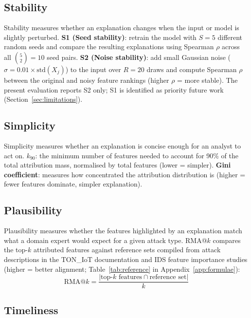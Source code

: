 \documentclass[12pt,a4paper]{report}
\begin{document}
\subsection{Stability}
\label{sec:stability}

Stability measures whether an explanation changes when the input or model is slightly perturbed. \textbf{S1 (Seed stability)}: retrain the model with $S = 5$ different random seeds and compare the resulting explanations using Spearman $\rho$ across all $\binom{5}{2} = 10$ seed pairs. \textbf{S2 (Noise stability)}: add small Gaussian noise ($\sigma = 0.01 \times \text{std}(X_j)$) to the input over $R = 20$ draws and compute Spearman $\rho$ between the original and noisy feature rankings (higher $\rho$ = more stable). The present evaluation reports S2 only; S1 is identified as priority future work (Section~\ref{sec:limitations}).

\subsection{Simplicity}
\label{sec:simplicity}

Simplicity measures whether an explanation is concise enough for an analyst to act on. \textbf{$k_{90}$}: the minimum number of features needed to account for 90\% of the total attribution mass, normalised by total features (lower = simpler). \textbf{Gini coefficient}: measures how concentrated the attribution distribution is (higher = fewer features dominate, simpler explanation).

\subsection{Plausibility}
\label{sec:plausibility}

Plausibility measures whether the features highlighted by an explanation match what a domain expert would expect for a given attack type. RMA@$k$ compares the top-$k$ attributed features against reference sets compiled from attack descriptions in the TON\_IoT documentation \cite{moustafa2021} and IDS feature importance studies \cite{shtayat2023} (higher = better alignment; Table~\ref{tab:reference} in Appendix~\ref{app:formulae}):
\begin{equation}
\text{RMA@}k = \frac{|\text{top-}k \text{ features} \cap \text{reference set}|}{k}
\end{equation}

\subsection{Timeliness}
\label{sec:timeliness}
\end{document}
